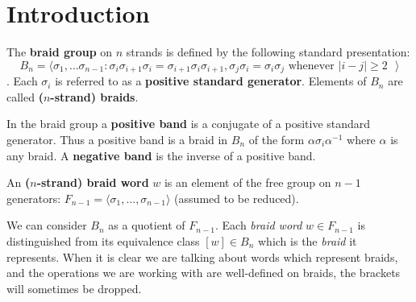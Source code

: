 \documentclass[12pt]{thesis}
\begin{document}
% 

\tableofcontents
\listoffigures

\mainmatter

\chapter{Introduction}

\begin{definition}
    The \textbf{braid group} on $n$ strands is defined by the following standard presentation:
    \[
    B_{n} = \langle \sigma_{1}, \ldots \sigma_{n - 1} \colon \sigma_{i}\sigma_{i + 1}\sigma_{i} = \sigma_{i + 1} \sigma_{i} \sigma_{i + 1},
     \sigma_{j}\sigma_{i} = \sigma_{i}\sigma_{j} \text{ whenever $|i - j| \geq 2$ } \rangle
    \].
    Each $\sigma_{i}$ is referred to as a \textbf{positive standard generator}.
    Elements of $B_{n}$ are called \textbf{($n$-strand) braids}.
\end{definition}

\begin{definition}
    In the braid group a \textbf{positive band} is a conjugate of a positive standard generator.
    Thus a positive band is a braid in $B_{n}$ of the form $\alpha \sigma_{i} \alpha^{-1}$ 
    where $\alpha$ is any braid.
    A \textbf{negative band} is the inverse of a positive band.
\end{definition}

\begin{definition}
    An \textbf{($n$-strand) braid word} $w$ is an element of the free group on $n-1$ generators: $F_{n-1} = \langle \sigma_{1}, \ldots, \sigma_{n-1} \rangle$ (assumed to be reduced).
\end{definition}

We can consider $B_{n}$ as a quotient of $F_{n-1}$.
Each \textit{braid word} $w \in F_{n-1}$ is distinguished from its equivalence class $[w] \in B_{n}$
which is the \textit{braid} it represents.
When it is clear we are talking about words which represent braids, and
the operations we are working with
are well-defined on braids, the brackets will sometimes be dropped.
\end{document}
